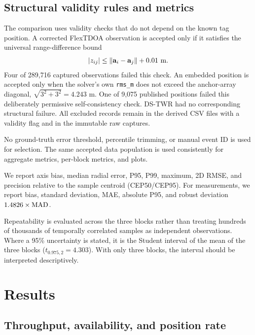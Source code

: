 \documentclass[11pt,a4paper]{article}
\begin{document}
\subsection{Structural validity rules and metrics}

The comparison uses validity checks that do not depend on the known tag
position. A corrected FlexTDOA observation is accepted only if it satisfies
the universal range-difference bound
\[
 |z_{ij}|\leq\|\mathbf a_i-\mathbf a_j\|+0.01\ {\rm m}.
\]
Four of 289,716 captured observations failed this check. An embedded position
is accepted only when the solver's own \texttt{rms\_m} does not exceed the
anchor-array diagonal, $\sqrt{3^2+3^2}=4.243$ m. One of 9,075 published
positions failed this deliberately permissive self-consistency check. DS-TWR
had no corresponding structural failure. All excluded records remain in the
derived CSV files with a validity flag and in the immutable raw captures.

No ground-truth error threshold, percentile trimming, or manual event ID is
used for selection. The same accepted data population is used consistently
for aggregate metrics, per-block metrics, and plots.

We report axis bias, median radial error, P95, P99, maximum, 2D RMSE, and
precision relative to the sample centroid (CEP50/CEP95). For measurements, we
report bias, standard deviation, MAE, absolute P95, and robust deviation
$1.4826\times{\rm MAD}$.

Repeatability is evaluated across the three blocks rather than treating
hundreds of thousands of temporally correlated samples as independent
observations. Where a 95\% uncertainty is stated, it is the Student interval
of the mean of the three blocks ($t_{0.975,2}=4.303$). With only three blocks,
the interval should be interpreted descriptively.

\section{Results}

\subsection{Throughput, availability, and position rate}
\end{document}
